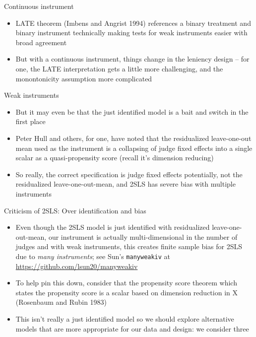 \documentclass{beamer}
\begin{document}
\begin{frame}{Continuous instrument}

\begin{itemize}
\item LATE theorem (Imbens and Angrist 1994) references a binary treatment and binary instrument technically making tests for weak instruments easier with broad agreement 
\item But with a continuous instrument, things change in the leniency design -- for one, the LATE interpretation gets a little more challenging, and the monontonicity assumption more complicated
\end{itemize}

\end{frame}

\begin{frame}{Weak instruments}

\begin{itemize}
\item But it may even be that the just identified model is a bait and switch in the first place
\item Peter Hull and others, for one, have noted that the residualized leave-one-out mean used as the instrument is a collapsing of judge fixed effects into a single scalar as a quasi-propensity score (recall it's dimension reducing)
\item So really, the correct specification is judge fixed effects potentially, not the residualized leave-one-out-mean, and 2SLS has severe bias with multiple instruments
\end{itemize}

\end{frame}


\begin{frame}{Criticism of 2SLS: Over identification and bias}

\begin{itemize}
\item Even though the 2SLS model is just identified with residualized leave-one-out-mean, our instrument is actually multi-dimensional in the number of judges and with weak instruments, this creates finite sample bias for 2SLS due to \emph{many instruments}; see Sun's \texttt{manyweakiv} at \url{https://github.com/lsun20/manyweakiv}


\item To help pin this down, consider that the propensity score theorem which states the propensity score is a scalar based on dimension reduction in X (Rosenbaum and Rubin 1983)

\item This isn't really a just identified model so we should explore alternative models that are more appropriate for our data and design: we consider three
\end{itemize}

\end{frame}
\end{document}
